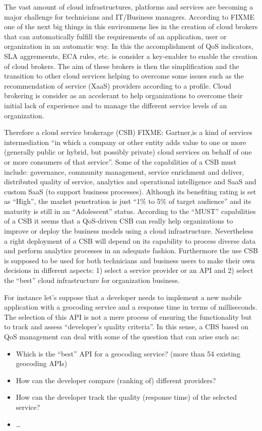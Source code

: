 The vast amount of cloud infrastructures, platforms and services are 
becoming a major challenge for technicians and IT/Business managers. According 
to FIXME one of the next big things in this environmens lies in the creation 
of cloud brokers that can automatically fulfill the requirements of an application, user 
or organization in an automatic way. In this the accomplishment of QoS indicators, 
SLA aggremeents, ECA rules, etc. is consider a key-enabler to enable the creation 
of cloud brokers. The aim of these brokers is then the simplification and 
the transition to other cloud services helping to overcome some issues such as 
the recommendation of service (XaaS) providers according to a profile. Cloud brokering 
is consider as an accelerant to help organizations to overcome their initial lack 
of experience and to manage the different service levels of an organization.

Therefore a cloud service brokerage (CSB) FIXME: Gartner,is a kind of services intermediation 
``in which a company or other entity adds value to one or more (generally public or hybrid, but possibly private) 
cloud services on behalf of one or more consumers of that service''. Some of the capabilities of a 
CSB must include: governance, community management, service enrichment and deliver, distributed quality of service, 
analytics and operational intelligence and SaaS and custom SaaS (to support business processes). 
Although its benefiting rating is set as ``High'', the market penetration is just ``1\% to 5\% of target audience'' 
and its maturity is still in an ``Adolescent'' status. According to the ``MUST'' capabilities of a CSB it 
seems that a QoS-driven CSB can really help organizations to improve or deploy the business models 
using a cloud infrastructure. Nevertheless a right deployment of a CSB will depend on its capability 
to process diverse data and perform analytics processes in an adequate fashion. Furthermore 
the use CSB is supposed to be used for both technicians and business users to make their 
own decisions in different aspects: 1) select a service provider or an API and 2) select 
the ``best'' cloud infrastructure for organization business.

For instance let's suppose that a developer needs to implement a new mobile application 
with a geocoding service and a response time in terms of milliseconds. The selection of this 
API is not a mere process of ensuring the functionality but to track 
and assess ``developer's quality criteria''. In this sense, a CBS based on QoS management can 
deal with some of the question that can arise such as:
\begin{itemize}
 \item Which is the ``best'' API for a geocoding service? (more than 54 existing geocoding APIs) 
 \item How can the developer compare (ranking of) different providers? 
 \item How can the developer track the quality (response time) of the selected service?
 \item \ldots
\end{itemize}

